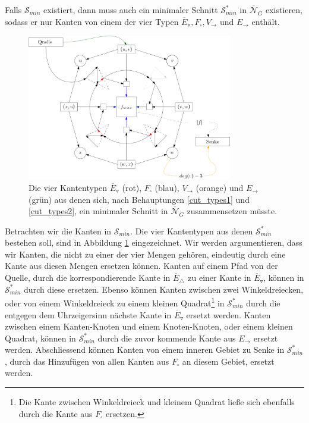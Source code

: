 \begin{claim} \label{cut_types1}
Falls $\mathcal{S}_{min}$ existiert, dann muss auch ein minimaler Schnitt $\mathcal{S}_{min}^*$ in $\overline{\mathcal{N}}_G$ existieren, sodass er nur Kanten von einem der vier Typen $\overline{E}_\triangledown, F_\square, V_\to$ und $E_\to$ enthält.
\end{claim}

\begin{figure}
	\centering
  	\includegraphics[width=0.8\textwidth]{face_cut.png}
  	\caption{Die vier Kantentypen $\overline{E}_\triangledown$ (rot), $F_\square$ (blau), $V_\to$ (orange) und $E_\to$ (grün) aus denen sich, nach Behauptungen \ref{cut_types1} und \ref{cut_types2}, ein minimaler Schnitt in $\overline{\mathcal{N}}_G$ zusammensetzen müsste.}
	\label{cut_edges}
\end{figure}

Betrachten wir die Kanten in $\mathcal{S}_{min}$. Die vier Kantentypen aus denen $\mathcal{S}_{min}^*$ bestehen soll, sind in Abbildung \ref{cut_edges} eingezeichnet. Wir werden argumentieren, dass wir Kanten, die nicht zu einer der vier Mengen gehören, eindeutig durch eine Kante aus diesen Mengen ersetzen können. Kanten auf einem Pfad von der Quelle, durch die korrespondierende Kante in $\overline{E}_\triangle$ zu einer Kante in $\overline{E}_\triangledown$, können in $\mathcal{S}_{min}^*$ durch diese ersetzen. Ebenso können Kanten zwischen zwei Winkeldreiecken, oder von einem Winkeldreieck zu einem kleinen Quadrat\footnote{Die Kante zwischen Winkeldreieck und kleinem Quadrat ließe sich ebenfalls durch die Kante aus $F_\square$ ersetzen.} in $\mathcal{S}_{min}^*$ durch die entgegen dem Uhrzeigersinn nächste Kante in $\overline{E}_\triangledown$ ersetzt werden. Kanten zwischen einem Kanten-Knoten und einem Knoten-Knoten, oder einem kleinen Quadrat, können in $\mathcal{S}_{min}^*$ durch die zuvor kommende Kante aus $E_\to$ ersetzt werden. Abschliessend können Kanten von einem inneren Gebiet zu Senke in $\mathcal{S}_{min}^*$ , durch das Hinzufügen von allen Kanten aus $F_\square$ an diesem Gebiet, ersetzt werden.


